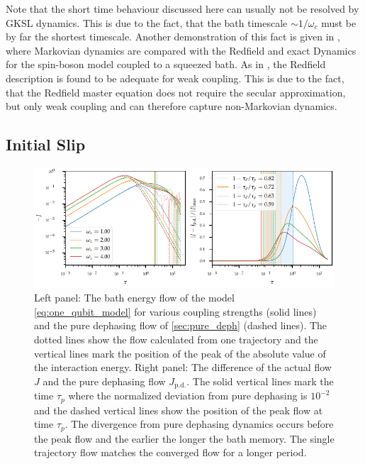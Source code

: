 Note that the short time behaviour discussed here can usually not be
resolved by GKSL dynamics. This is due to the fact, that the bath
timescale \(\sim 1/ω_{c}\) must be by far the shortest
timescale. Another demonstration of this fact is given in
\cite{Link2022Feb}, where Markovian dynamics are compared with the
Redfield and exact Dynamics for the spin-boson model coupled to a
squeezed bath. As in \cite{Xu2022Mar}, the Redfield description is
found to be adequate for weak coupling. This is due to the fact, that
the Redfield master equation does not require the secular
approximation, but only weak coupling and can therefore capture
non-Markovian dynamics.

\subsection{Initial Slip}
\label{sec:initial-slip-sb}
\begin{figure}[htp]
  \centering
  \includegraphics{figs/one_bath_syst/omega_initial_slip}
  \caption{\label{fig:omega_initial_slip} Left panel: The bath energy
    flow of the model \cref{eq:one_qubit_model} for various coupling
    strengths (solid lines) and the pure dephasing flow of
    \cref{sec:pure_deph} (dashed lines). The dotted lines show the
    flow calculated from one trajectory and the vertical lines mark
    the position of the peak of the absolute value of the interaction
    energy. Right panel: The difference of the actual flow \(J\) and
    the pure dephasing flow \(J_\mathrm{p.d.}\). The solid vertical
    lines mark the time \(τ_p\) where the normalized deviation from
    pure dephasing is \(10^{-2}\) and the dashed vertical lines show
    the position of the peak flow at time \(τ_p\). The divergence from
    pure dephasing dynamics occurs before the peak flow and the
    earlier the longer the bath memory. The single trajectory flow
    matches the converged flow for a longer period.}
\end{figure}

